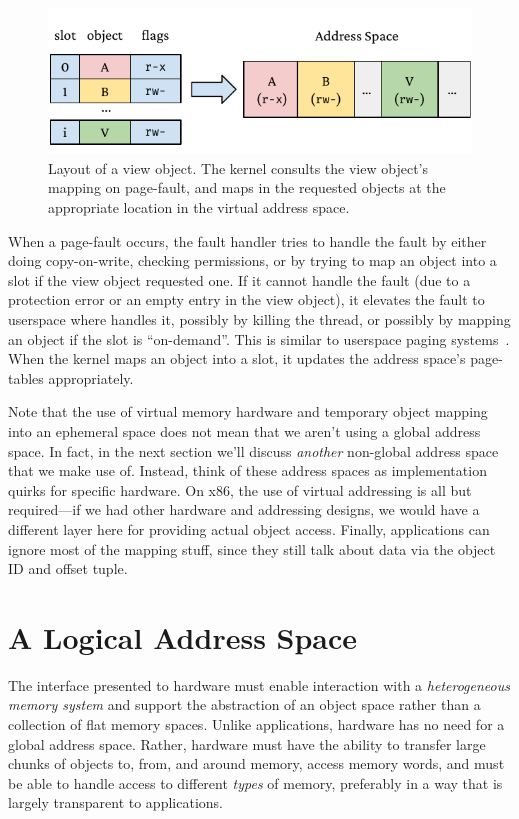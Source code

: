 \begin{figure}
    \centering
    \includegraphics[width=\linewidth]{fig/view}
    \caption{Layout of a view object. The kernel consults the view object's mapping on page-fault,
        and maps in the requested objects at the appropriate location in the virtual address space.}
    \label{fig:view}
\end{figure}

When a page-fault occurs, the fault handler tries to handle the fault by either doing copy-on-write,
checking permissions, or by trying to map an object into a slot if the view object requested one.
If it cannot handle the fault (due to a protection error or an empty entry in the view
object), it elevates the fault to userspace where \libcore handles it, possibly by killing the
thread, or possibly by mapping an object if the slot is ``on-demand''. This is similar to userspace
paging systems~\cite{l4,accetta:usenix86s}. When the kernel
maps an object into a slot, it updates the address space's page-tables appropriately.

Note that the use of virtual memory hardware and temporary object mapping into an ephemeral space does not mean that we
aren't using a global address space. In fact, in the next section we'll discuss \emph{another} non-global address space
that we make use of. Instead, think of these address spaces as implementation quirks for specific hardware. On x86, the
use of virtual addressing is all but required---if we had other hardware and addressing designs, we would have a
different layer here for providing actual object access. Finally, applications can ignore most of the \libcore mapping
stuff, since they still talk about data via the object ID and offset tuple.

\section{A Logical Address Space}

The interface presented to hardware must enable interaction with a
\textit{heterogeneous memory system} and support the abstraction of an object space rather than a
collection of flat memory spaces. Unlike applications, hardware has no need for
a global address space. Rather, hardware must
have the ability to transfer large chunks of objects to, from, and around memory, access memory words, and must be able to
handle access to different \emph{types} of memory, preferably in a way that is largely transparent to
applications.

